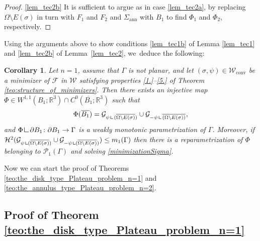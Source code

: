 \documentclass[11pt]{article}
\newcommand{\Subsection}{\subsection}
\numberwithin{equation}{section}
\newcommand{\R}{\mathbb{R}}
\let\Om\Omega
\newcommand\admclassconv{{\mathcal W_\mathrm{conv}}}
\newcommand{\openannulus}{\Sigma_\mathrm{ann}}
\newcommand{\resa}{\mathop{\hbox{\vrule height 7pt width 0.5pt depth 0pt
\vrule height 0.5pt width 6pt depth 0pt}}\nolimits}
\newcommand{\resb}{\mathop{\hbox{\vrule height 4pt width 0.5pt depth 0pt
\vrule height 0.5pt width 3pt depth 0pt}}\nolimits}
\newcommand{\res}{\mathchoice{\resa}{\resa}{\resb}{\resb}}
\newtheorem{cor}[theorem]{Corollary}
\theoremstyle{definition}
\begin{document}
\begin{proof}
\ref{lem_tec2b}
It is sufficient to argue as in case \ref{lem_tec2a},
by replacing $\Omega\setminus E(\sigma)$ in turn with $F_1$ and $F_2$ and
$\openannulus$ with $B_1$ to find $\Phi_1$ and $\Phi_2$, respectively.
\end{proof}

Using the arguments above to show conditions \ref{lem_tec1b} of Lemma \ref{lem_tec1} and \ref{lem_tec2b} of Lem\-ma~\ref{lem_tec2}, we~deduce the following:

\begin{cor}\label{lem_tec3}
Let $n=1$, assume that $\Gamma$ is not planar, and let $(\sigma,\psi)\in\admclassconv$ be a minimizer of
$\mathcal F$ in
$\mathcal W$
satisfying properties \ref{1.}--\ref{5.} of Theorem \ref{teo:structure_of_minimizers}. Then there exists an injective map $\Phi\in W^{1,1}(B_1;\R^3)\cap C^0(\overline{B_1};\R^3)$ such that
\[
\Phi(\overline{B_1})=\mathcal G_{\psi\res {(\overline{\Om\setminus E(\sigma)})}}
\cup\mathcal G_{-\psi\res{\overline{(\Om\setminus E(\sigma))}}},
\]
and $\Phi\res \partial B_1\colon\partial B_1\to \Gamma$ is a weakly monotonic parametrization of $\Gamma$. Moreover, if $\mathcal H^2(\mathcal G_{\psi\res (\overline{\Om\setminus E(\sigma)})}
\cup\mathcal G_{-\psi\res(\overline{\Om\setminus E(\sigma)})})\leq m_1(\Gamma)$ then there is a reparametrization
of $\Phi$ belonging to $\mathcal P_1(\Gamma)$ and solving \eqref{minimizationSigma}.
\end{cor}

Now we can start the proof of Theorems \ref{teo:the_disk_type_Plateau_problem_n=1} and
\ref{teo:the_annulus_type_Plateau_problem_n=2}.

\Subsection{Proof of Theorem \ref{teo:the_disk_type_Plateau_problem_n=1}}
\end{document}
